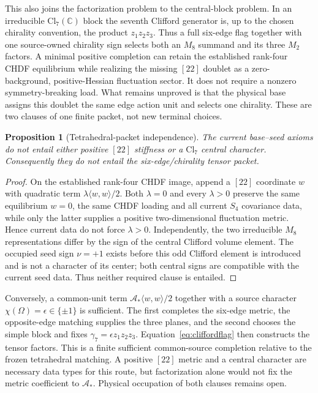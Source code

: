 \documentclass[11pt]{article}
\newtheorem{proposition}{Proposition}
\begin{document}
This also joins the factorization problem to the central-block problem. In an
irreducible $\mathrm{Cl}_7(\mathbb C)$ block the seventh Clifford generator is,
up to the chosen chirality convention, the product $z_1z_2z_3$. Thus a full
six-edge flag together with one source-owned chirality sign selects both an
$M_8$ summand and its three $M_2$ factors. A minimal positive completion can
retain the established rank-four CHDF equilibrium while realizing the missing
$[22]$ doublet as a zero-background, positive-Hessian fluctuation sector. It
does not require a nonzero symmetry-breaking load. What remains unproved is
that the physical base assigns this doublet the same edge action unit and
selects one chirality. These are two clauses of one finite packet, not new
terminal choices.

\begin{proposition}[Tetrahedral-packet independence]
\label{prop:tetpacketindependence}
The current base--seed axioms do not entail either positive $[22]$ stiffness
or a $\mathrm{Cl}_7$ central character. Consequently they do not entail the
six-edge/chirality tensor packet.
\end{proposition}

\begin{proof}
On the established rank-four CHDF image, append a $[22]$ coordinate $w$ with
quadratic term $\lambda\langle w,w\rangle/2$. Both $\lambda=0$ and every
$\lambda>0$ preserve the same equilibrium $w=0$, the same CHDF loading and
all current $S_4$ covariance data, while only the latter supplies a positive
two-dimensional fluctuation metric. Hence current data do not force
$\lambda>0$. Independently, the two irreducible $M_8$ representations differ
by the sign of the central Clifford volume element. The occupied seed sign
$\nu=+1$ exists before this odd Clifford element is introduced and is not a
character of its center; both central signs are compatible with the current
seed data. Thus neither required clause is entailed.
\end{proof}

Conversely, a common-unit term
$\mathcal A_*\langle w,w\rangle/2$ together with a source character
$\chi(\Omega)=\epsilon\in\{\pm1\}$ is sufficient. The first completes the
six-edge metric, the opposite-edge matching supplies the three planes, and
the second chooses the simple block and fixes
$\gamma_7=\epsilon z_1z_2z_3$. Equation~\eqref{eq:cliffordflag} then
constructs the tensor factors. This is a finite sufficient common-source
completion relative to the frozen tetrahedral matching. A positive $[22]$
metric and a central character are necessary data types for this route, but
factorization alone would not fix the metric coefficient to $\mathcal A_*$.
Physical occupation of both clauses remains open.
\end{document}

